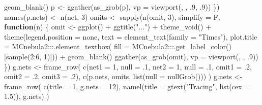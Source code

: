 \documentclass[
]{article}
\newenvironment{Shaded}{\begin{snugshade}}{\end{snugshade}}
\newcommand{\AttributeTok}[1]{\textcolor[rgb]{0.77,0.63,0.00}{#1}}
\newcommand{\ControlFlowTok}[1]{\textcolor[rgb]{0.13,0.29,0.53}{\textbf{#1}}}
\newcommand{\DecValTok}[1]{\textcolor[rgb]{0.00,0.00,0.81}{#1}}
\newcommand{\FloatTok}[1]{\textcolor[rgb]{0.00,0.00,0.81}{#1}}
\newcommand{\FunctionTok}[1]{\textcolor[rgb]{0.00,0.00,0.00}{#1}}
\newcommand{\NormalTok}[1]{#1}
\newcommand{\OtherTok}[1]{\textcolor[rgb]{0.56,0.35,0.01}{#1}}
\newcommand{\SpecialCharTok}[1]{\textcolor[rgb]{0.00,0.00,0.00}{#1}}
\newcommand{\StringTok}[1]{\textcolor[rgb]{0.31,0.60,0.02}{#1}}
\begin{document}
\begin{Shaded}
\begin{Highlighting}[]
      \FunctionTok{geom\_blank}\NormalTok{()}
\NormalTok{    p }\OtherTok{\textless{}{-}} \FunctionTok{ggather}\NormalTok{(}\FunctionTok{as\_grob}\NormalTok{(p), }\AttributeTok{vp =} \FunctionTok{viewport}\NormalTok{(, , .}\DecValTok{9}\NormalTok{, .}\DecValTok{9}\NormalTok{))}
\NormalTok{  \})}
\FunctionTok{names}\NormalTok{(p.nets) }\OtherTok{\textless{}{-}} \FunctionTok{n}\NormalTok{(net, }\DecValTok{3}\NormalTok{)}
\NormalTok{omits }\OtherTok{\textless{}{-}} \FunctionTok{sapply}\NormalTok{(}\FunctionTok{n}\NormalTok{(omit, }\DecValTok{3}\NormalTok{), }\AttributeTok{simplify =}\NormalTok{ F,}
  \ControlFlowTok{function}\NormalTok{(n) \{}
\NormalTok{    omit }\OtherTok{\textless{}{-}} \FunctionTok{ggplot}\NormalTok{() }\SpecialCharTok{+}
      \FunctionTok{ggtitle}\NormalTok{(}\StringTok{"..."}\NormalTok{) }\SpecialCharTok{+}
      \FunctionTok{theme\_void}\NormalTok{() }\SpecialCharTok{+}
      \FunctionTok{theme}\NormalTok{(}\AttributeTok{legend.position =} \StringTok{\textquotesingle{}none\textquotesingle{}}\NormalTok{,}
        \AttributeTok{text =} \FunctionTok{element\_text}\NormalTok{(}\AttributeTok{family =} \StringTok{"Times"}\NormalTok{),}
        \AttributeTok{plot.title =}\NormalTok{ MCnebula2}\SpecialCharTok{:::}\FunctionTok{.element\_textbox}\NormalTok{(}
          \AttributeTok{fill =}\NormalTok{ MCnebula2}\SpecialCharTok{:::}\FunctionTok{.get\_label\_color}\NormalTok{()[}\FunctionTok{sample}\NormalTok{(}\DecValTok{2}\SpecialCharTok{:}\DecValTok{6}\NormalTok{, }\DecValTok{1}\NormalTok{)])) }\SpecialCharTok{+}
      \FunctionTok{geom\_blank}\NormalTok{()}
    \FunctionTok{ggather}\NormalTok{(}\FunctionTok{as\_grob}\NormalTok{(omit), }\AttributeTok{vp =} \FunctionTok{viewport}\NormalTok{(, , .}\DecValTok{9}\NormalTok{))}
\NormalTok{  \})}
\NormalTok{g.nets }\OtherTok{\textless{}{-}} \FunctionTok{frame\_row}\NormalTok{(}
  \FunctionTok{c}\NormalTok{(}\AttributeTok{net1 =} \DecValTok{1}\NormalTok{, }\AttributeTok{null =}\NormalTok{ .}\DecValTok{1}\NormalTok{, }\AttributeTok{net2 =} \DecValTok{1}\NormalTok{, }\AttributeTok{null =}\NormalTok{ .}\DecValTok{1}\NormalTok{,}
    \AttributeTok{omit1 =}\NormalTok{ .}\DecValTok{2}\NormalTok{, }\AttributeTok{omit2 =}\NormalTok{ .}\DecValTok{2}\NormalTok{, }\AttributeTok{omit3 =}\NormalTok{ .}\DecValTok{2}\NormalTok{),}
  \FunctionTok{c}\NormalTok{(p.nets, omits, }\FunctionTok{list}\NormalTok{(}\AttributeTok{null =} \FunctionTok{nullGrob}\NormalTok{()))}
\NormalTok{)}
\NormalTok{g.nets }\OtherTok{\textless{}{-}} \FunctionTok{frame\_row}\NormalTok{(}
  \FunctionTok{c}\NormalTok{(}\AttributeTok{title =} \DecValTok{1}\NormalTok{, }\AttributeTok{g.nets =} \DecValTok{12}\NormalTok{),}
  \FunctionTok{namel}\NormalTok{(}\AttributeTok{title =} \FunctionTok{gtext}\NormalTok{(}\StringTok{"Tracing"}\NormalTok{, }\FunctionTok{list}\NormalTok{(}\AttributeTok{cex =} \FloatTok{1.5}\NormalTok{)), g.nets)}
\NormalTok{)}
\end{Highlighting}
\end{Shaded}
\end{document}
